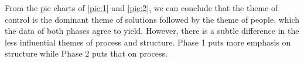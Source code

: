 From the pie charts of \ref{pie:1} and \ref{pie:2}, we can conclude that the theme of control is the dominant theme of solutions followed by the theme of people, which the data of both phases agree to yield. However, there is a subtle difference in the less influential themes of process and structure. Phase 1 puts more emphasis on structure while Phase 2 puts that on process.

\begin{comment}
\section{Comparison}

In this section, a comparison is made to investigate the correlation and the differences of our findings and the Thai business case study. We identify the findings of our sources and our evaluation framework. Correlations are listed as subsection headings.

\subsection{Governance}

In the Thai business case study, the authors argue that risk management can be well developed if both ICT governance and Information security governance
\end{comment}
